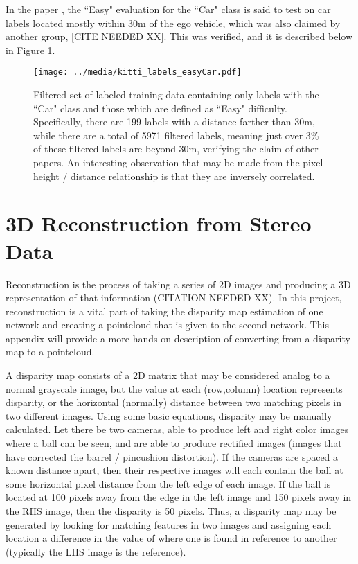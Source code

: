 In the paper \cite{wang_pseudo-lidar_2019}, the ``Easy" evaluation for the ``Car" class is said to test on car labels located mostly within 30m of the ego vehicle, which was also claimed by another group, [CITE NEEDED XX]. This was verified, and it is described below in Figure \ref{kitti_labels_easyCar}. 

\begin{figure}[h]
	\centering
	\texttt{[image: ../media/kitti\_labels\_easyCar.pdf]}
	\caption{Filtered set of labeled training data containing only labels with the ``Car" class and those which are defined as ``Easy" difficulty. Specifically, there are 199 labels with a distance farther than 30m, while there are a total of 5971 filtered labels, meaning just over 3\% of these filtered labels are beyond 30m, verifying the claim of other papers. An interesting observation that may be made from the pixel height / distance relationship is that they are inversely correlated.}
	\label{kitti_labels_easyCar} %
\end{figure}


\newpage
\section{3D Reconstruction from Stereo Data}
\label{appendix_reconstruct}
Reconstruction is the process of taking a series of 2D images and producing a 3D representation of that information (CITATION NEEDED XX). In this project, reconstruction is a vital part of taking the disparity map estimation of one network and creating a pointcloud that is given to the second network. This appendix will provide a more hands-on description of converting from a disparity map to a pointcloud. 

A disparity map consists of a 2D matrix that may be considered analog to a normal grayscale image, but the value at each (row,column) location represents disparity, or the horizontal (normally) distance between two matching pixels in two different images. Using some basic equations, disparity may be manually calculated. Let there be two cameras, able to produce left and right color images where a ball can be seen, and are able to produce rectified images (images that have corrected the barrel / pincushion distortion). If the cameras are spaced a known distance apart, then their respective images will each contain the ball at some horizontal pixel distance from the left edge of each image. If the ball is located at 100 pixels away from the edge in the left image and 150 pixels away in the RHS image, then the disparity is 50 pixels. Thus, a disparity map may be generated by looking for matching features in two images and assigning each location a difference in the value of where one is found in reference to another (typically the LHS image is the reference).

